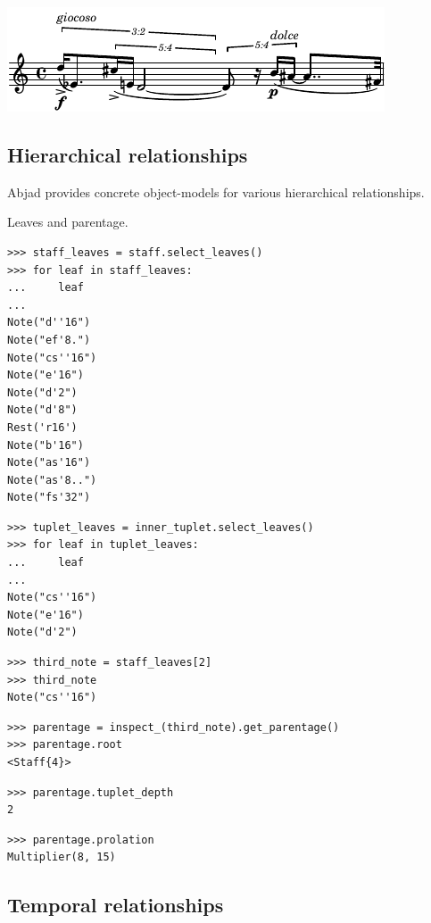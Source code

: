 \includegraphics[scale=1.0]{images/relationship_modeling-3.pdf}


\subsection{Hierarchical relationships}

Abjad provides concrete object-models for various hierarchical relationships.

Leaves and parentage.

\begin{lstlisting}
>>> staff_leaves = staff.select_leaves()
>>> for leaf in staff_leaves:
...     leaf
... 
Note("d''16")
Note("ef'8.")
Note("cs''16")
Note("e'16")
Note("d'2")
Note("d'8")
Rest('r16')
Note("b'16")
Note("as'16")
Note("as'8..")
Note("fs'32")
\end{lstlisting}


\begin{lstlisting}
>>> tuplet_leaves = inner_tuplet.select_leaves()
>>> for leaf in tuplet_leaves:
...     leaf
... 
Note("cs''16")
Note("e'16")
Note("d'2")
\end{lstlisting}


\begin{lstlisting}
>>> third_note = staff_leaves[2]
>>> third_note
Note("cs''16")
\end{lstlisting}



\begin{lstlisting}
>>> parentage = inspect_(third_note).get_parentage()
>>> parentage.root
<Staff{4}>
\end{lstlisting}


\begin{lstlisting}
>>> parentage.tuplet_depth
2
\end{lstlisting}


\begin{lstlisting}
>>> parentage.prolation
Multiplier(8, 15)
\end{lstlisting}


\subsection{Temporal relationships}

